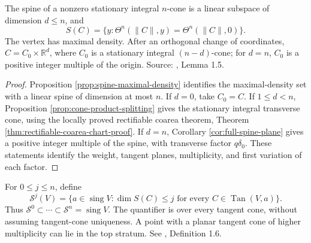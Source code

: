 \begin{theorem}\label{thm:cone-spine-splitting}
The spine of a nonzero stationary integral $n$-cone is a linear subspace of dimension $d\leq n$, and
\[
 S(C)=\{y:\Theta^n(\|C\|,y)=\Theta^n(\|C\|,0)\}.
\]
The vertex has maximal density. After an orthogonal change of coordinates, $C=C_0\times\mathbb R^d$, where $C_0$ is a stationary integral $(n-d)$-cone; for $d=n$, $C_0$ is a positive integer multiple of the origin. Source: \cite{Minter}, Lemma 1.5.
\end{theorem}
\begin{proof}
Proposition \ref{prop:spine-maximal-density} identifies the maximal-density set with a linear spine of dimension at most $n$. If $d=0$, take $C_0=C$. If $1\leq d<n$, Proposition \ref{prop:cone-product-splitting} gives the stationary integral transverse cone, using the locally proved rectifiable coarea theorem, Theorem \ref{thm:rectifiable-coarea-chart-proof}. If $d=n$, Corollary \ref{cor:full-spine-plane} gives a positive integer multiple of the spine, with transverse factor $q\delta_0$. These statements identify the weight, tangent planes, multiplicity, and first variation of each factor.
\end{proof}

\begin{definition}\label{def:singular-strata}
For $0\leq j\leq n$, define
\[
 \mathcal S^j(V)=\{a\in\operatorname{sing}V:
 \dim S(C)\leq j\text{ for every }C\in\operatorname{Tan}(V,a)\}.
\]
Thus $\mathcal S^0\subset\cdots\subset\mathcal S^n=\operatorname{sing}V$. The quantifier is over every tangent cone, without assuming tangent-cone uniqueness. A point with a planar tangent cone of higher multiplicity can lie in the top stratum. See \cite{Minter}, Definition 1.6.
\end{definition}

